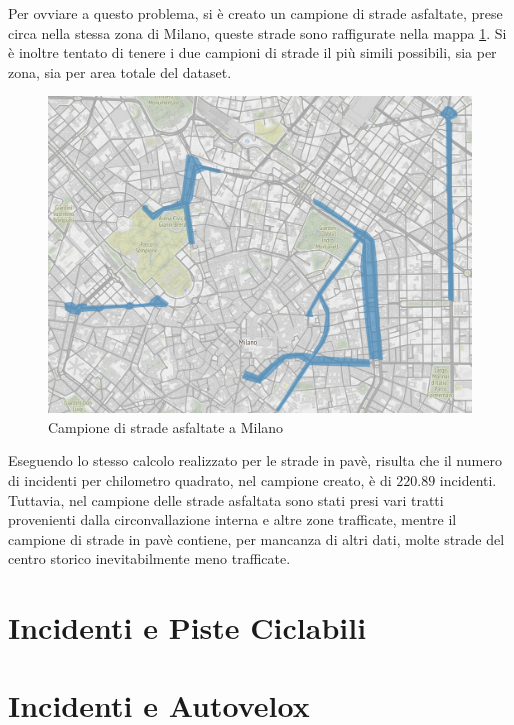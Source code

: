 \documentclass[a4paper]{report}
\begin{document}
Per ovviare a questo problema, si è creato un campione di strade asfaltate, prese circa 
nella stessa zona di Milano, queste strade sono raffigurate nella mappa \ref{fig:mappa-asfalto}. 
Si è inoltre tentato di tenere i due campioni di strade il più simili possibili, sia per zona, 
sia per area totale del dataset.

\begin{figure}
    \includegraphics[width=\linewidth]{../src/pave/mappa_asfalto.png}
    \caption{Campione di strade asfaltate a Milano}
    \label{fig:mappa-asfalto}
\end{figure}

Eseguendo lo stesso calcolo realizzato per le strade in pavè, risulta che il numero di incidenti per 
chilometro quadrato, nel campione creato, è di $220.89$ incidenti.
Tuttavia, nel campione delle strade asfaltata sono stati presi vari tratti provenienti dalla circonvallazione 
interna e altre zone trafficate, mentre il campione di strade in pavè contiene, per mancanza di altri dati, 
molte strade del centro storico inevitabilmente meno trafficate.

\section{Incidenti e Piste  Ciclabili}


\section{Incidenti e Autovelox}
\end{document}
